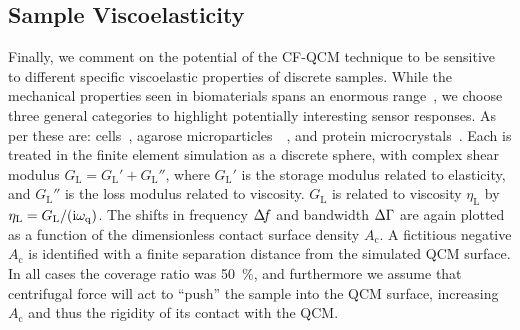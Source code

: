 

\subsection{Sample Viscoelasticity}
\label{sec:sampleviscoelasticity}
Finally, we comment on the potential of the CF-QCM technique to be
sensitive to different specific viscoelastic properties of discrete samples.  While
the mechanical properties seen in biomaterials spans an enormous
range~\cite{meyers2008biological}, we choose three general categories to
highlight potentially interesting sensor responses.  As per
 these are: cells~\cite{li2008thickness}, agarose
microparticles~\cite{li2011surface}~\cite{patra2009viscoelastic}, and
protein microcrystals~\cite{zamiri2009modeling}.  Each is treated in the
finite element simulation as a discrete sphere, with complex shear modulus
$G_\mathrm{L}=G_\mathrm{L}'+G_\mathrm{L}''$, where $G_\mathrm{L}'$ is the
storage modulus related to elasticity, and $G_\mathrm{L}''$ is the loss
modulus related to viscosity.  $G_\mathrm{L}$ is related to viscosity
$\eta_\mathrm{L}$ by $\eta_\mathrm{L}=G_\mathrm{L}/({\mathrm{i}}\omega_\mathrm{q})$.  The
shifts in frequency $\Delta\!f$ and bandwidth $\Delta\Gamma$ are again plotted as a function of
the dimensionless contact surface density $A_\mathrm{c}$.
A fictitious negative $A_\mathrm{c}$
is identified with a finite separation distance from the
simulated QCM surface.  In all cases the coverage ratio was
\SI{50}{\percent}, and furthermore we assume that centrifugal force will act to
``push'' the sample into the QCM surface, increasing $A_\mathrm{c}$ and
thus the rigidity of its contact with the QCM.
